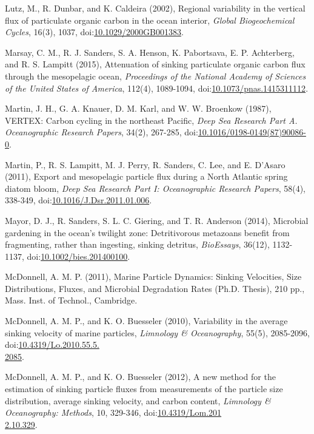 \begin{singlespace}
{{Lutz, M., R. Dunbar, and K. Caldeira (2002), Regional variability in the vertical flux of particulate organic carbon in the ocean interior, \emph{Global Biogeochemical Cycles}, 16(3), 1037, doi:\href{http://dx.doi.org/10.1029/2000GB001383}{10.1029/2000GB001383}.

Marsay, C. M., R. J. Sanders, S. A. Henson, K. Pabortsava, E. P. Achterberg, and R. S. Lampitt (2015), Attenuation of sinking particulate organic carbon flux through the mesopelagic ocean, \emph{Proceedings of the National Academy of Sciences of the United States of America}, 112(4), 1089-1094, doi:\href{http://dx.doi.org/10.1073/pnas.1415311112}{10.1073/pnas.1415311112}.

Martin, J. H., G. A. Knauer, D. M. Karl, and W. W. Broenkow (1987), VERTEX: Carbon cycling in the northeast Pacific, \emph{Deep Sea Research Part A. Oceanographic Research Papers}, 34(2), 267-285, doi:\href{http://dx.doi.org/10.1016/0198-0149\%2887\%2990086-0}{10.1016/0198-0149(87)90086-0}.

Martin, P., R. S. Lampitt, M. J. Perry, R. Sanders, C. Lee, and E. D'Asaro (2011), Export and mesopelagic particle flux during a North Atlantic spring diatom bloom, \emph{Deep Sea Research Part I: Oceanographic Research Papers}, 58(4), 338-349, doi:\href{http://dx.doi.org/10.1016/J.Dsr.2011.01.006}{10.1016/J.Dsr.2011.01.006}.

Mayor, D. J., R. Sanders, S. L. C. Giering, and T. R. Anderson (2014), Microbial gardening in the ocean's twilight zone: Detritivorous metazoans benefit from fragmenting, rather than ingesting, sinking detritus, \emph{BioEssays}, 36(12), 1132-1137, doi:\href{http://dx.doi.org/10.1002/bies.201400100}{10.1002/bies.201400100}.

McDonnell, A. M. P. (2011), Marine Particle Dynamics: Sinking Velocities, Size Distributions, Fluxes, and Microbial Degradation Rates (Ph.D. Thesis), 210 pp., Mass. Inst. of Technol., Cambridge.

McDonnell, A. M. P., and K. O. Buesseler (2010), Variability in the average sinking velocity of marine particles, \emph{Limnology \& Oceanography}, 55(5), 2085-2096, doi:\href{http://dx.doi.org/10.4319/Lo.2010.55.5.2085}{10.4319/Lo.2010.55.5.\\2085}.

McDonnell, A. M. P., and K. O. Buesseler (2012), A new method for the estimation of sinking particle fluxes from measurements of the particle size distribution, average sinking velocity, and carbon content, \emph{Limnology \& Oceanography: Methods}, 10, 329-346, doi:\href{http://dx.doi.org/10.4319/Lom.2012.10.329}{10.4319/Lom.201\\2.10.329}.

}}
\end{singlespace}
